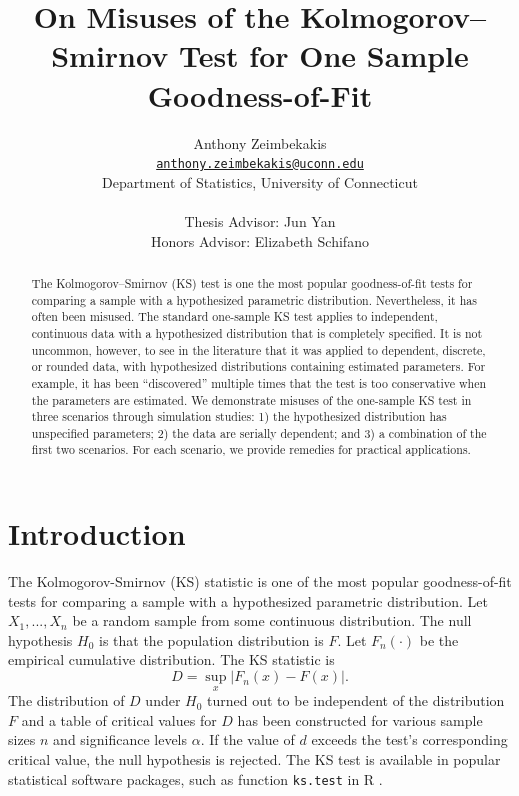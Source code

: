 \documentclass[12pt, letterpaper, titlepage]{article}
\title{On Misuses of the Kolmogorov--Smirnov Test for One Sample Goodness-of-Fit}
\author{Anthony Zeimbekakis\\
\href{mailto:anthony.zeimbekakis@uconn.edu}{\nolinkurl{anthony.zeimbekakis@uconn.edu}}\\
Department of Statistics, University of Connecticut\\\\
Thesis Advisor: Jun Yan\\
Honors Advisor: Elizabeth Schifano}
\date{}
\begin{document}
\maketitle

\doublespace

\begin{abstract}
The Kolmogorov--Smirnov (KS) test is one the most popular goodness-of-fit tests 
for comparing a sample with a hypothesized parametric distribution. Nevertheless, 
it has often been misused. The standard one-sample KS test applies to independent, 
continuous data with a hypothesized distribution that is completely specified. 
It is not uncommon, however, to see in the literature that it was applied to 
dependent, discrete, or rounded data, with hypothesized distributions containing 
estimated parameters. For example, it has been ``discovered'' multiple times 
that the test is too conservative when the parameters are estimated. We 
demonstrate misuses of the one-sample KS test in three scenarios through 
simulation studies:
1) the hypothesized distribution has unspecified parameters;
2) the data are serially dependent; and
3) a combination of the first two scenarios.
For each scenario, we provide remedies for practical applications.
\end{abstract}

\section{Introduction}\label{sec:intro}

The Kolmogorov-Smirnov (KS) statistic is one of the most popular goodness-of-fit 
tests for comparing a sample with a hypothesized parametric distribution.
Let $X_1, ..., X_n$ be a random sample from some continuous distribution. 
The null hypothesis $H_0$ is that the population distribution is $F$.
Let $F_n(\cdot)$ be the empirical cumulative distribution. The KS statistic is
\begin{equation}
  \label{eq:ks_standard}
  D = \sup_x | F_{n}(x) - F(x) |.
\end{equation}
The distribution of $D$ under $H_0$ turned out to be independent of the
distribution $F$ and a table of critical values for $D$ has been constructed
\citep{Massey} for various sample sizes $n$ and significance 
levels $\alpha$. If the value of $d$ exceeds the test's corresponding critical 
value, the null hypothesis is rejected. The KS test is available in popular 
statistical software packages, such as function \texttt{ks.test} in R 
\citep{R, Marsaglia}.
\end{document}
